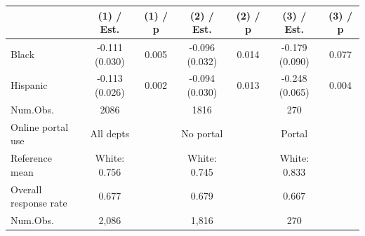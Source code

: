 
\begin{tabular}[t]{lcccccc}
\toprule
  & (1) / Est. & (1) / p & (2) / Est. & (2) / p & (3) / Est. & (3) / p\\
\midrule
Black & -0.111 
(0.030) & 0.005 & -0.096 
(0.032) & 0.014 & -0.179 
(0.090) & 0.077\\
Hispanic & -0.113 
(0.026) & 0.002 & -0.094 
(0.030) & 0.013 & -0.248 
(0.065) & 0.004\\
\midrule
Num.Obs. & 2086 &  & 1816 &  & 270 & \\
Online portal use & All depts &  & No portal &  & Portal & \\
Reference mean & White: 0.756 &  & White: 0.745 &  & White: 0.833 & \\
Overall response rate & 0.677 &  & 0.679 &  & 0.667 & \\
Num.Obs. & 2,086 &  & 1,816 &  & 270 & \\
\bottomrule
\end{tabular}
